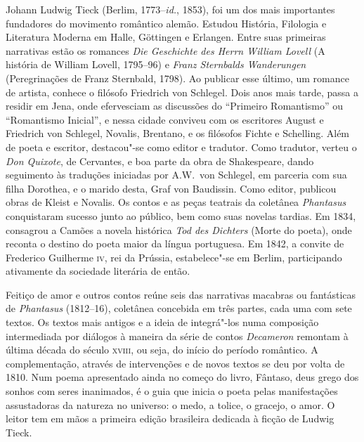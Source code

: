 
\begin{resumopage}

\item[Johann Ludwig Tieck] (Berlim, 1773--\textit{id.}, 1853), 
foi um dos mais importantes fundadores do movimento romântico alemão. 
Estudou História, Filologia e Literatura Moderna em Halle, 
Göttingen e Erlangen. Entre suas primeiras narrativas estão os romances 
\textit{Die Geschichte des Herrn William Lovell} (A história de William Lovell, 
1795--96) e \textit{Franz Sternbalds Wanderungen} 
(Peregrinações de Franz Sternbald, 1798). 
Ao publicar esse último, um romance de artista, conhece o filósofo 
Friedrich von Schlegel.  Dois anos mais tarde, passa a residir em Jena, 
onde efervesciam as  discussões do ``Primeiro Romantismo'' ou ``Romantismo 
Inicial'', e nessa  cidade conviveu com os escritores August e Friedrich von Schlegel, 
Novalis, Brentano, e os filósofos Fichte e Schelling. Além de poeta e escritor, destacou"-se 
como editor e tradutor. Como tradutor, verteu o \textit{Don Quixote}, de Cervantes, 
e boa parte da obra de Shakespeare, dando seguimento às traduções iniciadas 
por A.W.~von Schlegel, em parceria com sua filha Dorothea, e o marido desta,
Graf von Baudissin. Como editor, publicou obras de Kleist e Novalis.
Os contos e as peças teatrais da coletânea \textit{Phantasus} conquistaram 
sucesso junto ao público, bem como suas novelas tardias. Em 1834, consagrou 
a Camões a novela histórica \textit{Tod des Dichters} (Morte do poeta), onde 
reconta o destino do poeta maior da língua portuguesa. Em 1842, a convite 
de Frederico Guilherme \textsc{iv}, rei da Prússia, estabelece"-se em Berlim, 
participando ativamente da sociedade literária de então.

\item[Feitiço de amor e outros contos] reúne seis das narrativas macabras ou fantásticas de 
\textit{Phantasus} (1812--16), coletânea concebida em três partes, 
cada uma com sete textos. Os textos mais antigos e a ideia de integrá"-los 
numa composição intermediada por diálogos à maneira da série de contos 
\textit{Decameron} remontam à última década do século \textsc{xviii}, 
ou seja, do início do período romântico. A complementação, 
através de intervenções e de novos textos se deu por volta 
de 1810. Num poema apresentado ainda no começo do livro, Fântaso, 
deus grego dos sonhos com seres inanimados, é o guia que inicia o 
poeta pelas manifestações assustadoras da natureza no universo: 
o medo, a tolice, o gracejo, o amor. O leitor tem em mãos a primeira 
edição brasileira dedicada à ficção de Ludwig Tieck.   
        

\end{resumopage}
